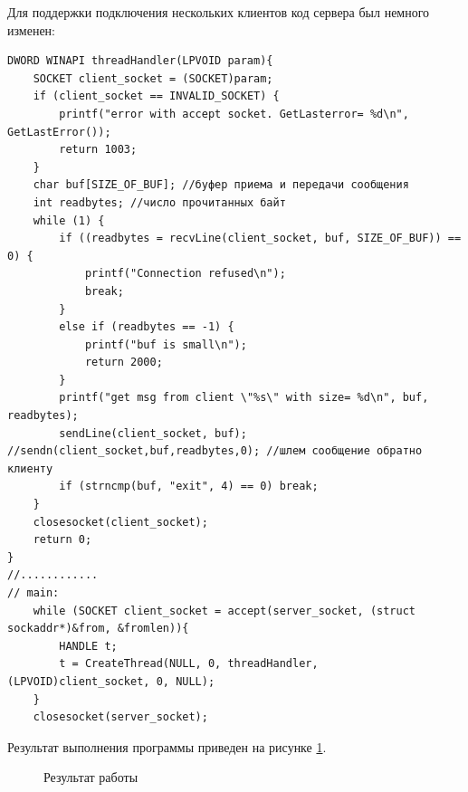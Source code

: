 \documentclass[a4paper]{article}
\begin{document}
	Для поддержки подключения нескольких клиентов код сервера был немного изменен:
	\begin{lstlisting}[style=crs_cpp]
DWORD WINAPI threadHandler(LPVOID param){
	SOCKET client_socket = (SOCKET)param;
	if (client_socket == INVALID_SOCKET) {
		printf("error with accept socket. GetLasterror= %d\n", GetLastError());
		return 1003;
	}
	char buf[SIZE_OF_BUF]; //буфер приема и передачи сообщения 
	int readbytes; //число прочитанных байт 
	while (1) {
		if ((readbytes = recvLine(client_socket, buf, SIZE_OF_BUF)) == 0) {
			printf("Connection refused\n");
			break;
		}
		else if (readbytes == -1) {
			printf("buf is small\n");
			return 2000;
		}
		printf("get msg from client \"%s\" with size= %d\n", buf, readbytes);
		sendLine(client_socket, buf); //sendn(client_socket,buf,readbytes,0); //шлем сообщение обратно клиенту
		if (strncmp(buf, "exit", 4) == 0) break;
	}
	closesocket(client_socket);
	return 0;
}
//............
// main:
	while (SOCKET client_socket = accept(server_socket, (struct sockaddr*)&from, &fromlen)){
		HANDLE t;
		t = CreateThread(NULL, 0, threadHandler, (LPVOID)client_socket, 0, NULL);
	}
	closesocket(server_socket);
	\end{lstlisting}
	
	Результат выполнения программы приведен на рисунке \ref{img:task6_2}.
	\begin{figure}[h!]
		\caption{Результат работы}
		\label{img:task6_2}
	\end{figure}
	
\end{document}
